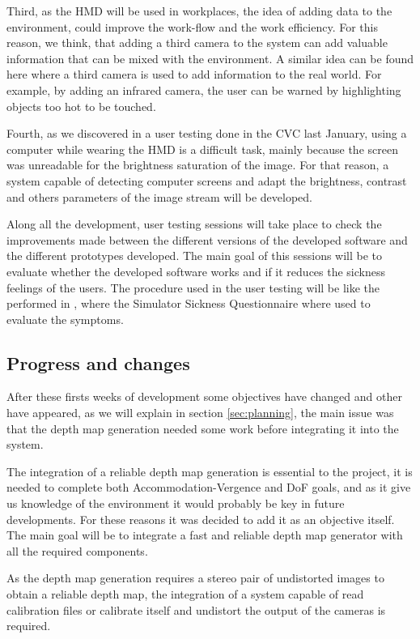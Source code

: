 \documentclass[10pt,a4paper,twocolumn,twoside]{article}
\begin{document}
	Third, as the HMD will be used in workplaces, the idea of adding data to the environment, could improve the work-flow and the work efficiency. For this reason, we think, that adding a third camera to the system can add valuable information that can be mixed with the environment. A similar idea can be found here \cite{vismerge} where a third camera is used to add information to the real world. For example, by adding an infrared camera, the user can be warned by highlighting objects too hot to be touched.
	
	Fourth, as we discovered in a user testing done in the CVC \cite{unpublishCVC} last January, using a computer while wearing the HMD is a difficult task, mainly because the screen was unreadable for the brightness saturation of the image. For that reason, a system capable of detecting computer screens and adapt the brightness, contrast and others parameters of the image stream will be developed.
	
	Along all the development, user testing sessions will take place to check the improvements made between the different versions of the developed software and the different prototypes developed. The main goal of this sessions will be to evaluate whether the developed software works and if it reduces the sickness feelings of the users. The procedure used in the user testing will be like the performed in \cite{ifftConfortDoF}, where the Simulator Sickness Questionnaire \cite{ssqQuestion} where used to evaluate the symptoms. 
	
	\subsection{Progress and changes}
	
	After these firsts weeks of development some objectives have changed and other have appeared, as we will explain in section \ref{sec:planning}, the main issue was that the depth map generation needed some work before integrating it into the system.
	
	The integration of a reliable depth map generation is essential to the project, it is needed to complete both Accommodation-Vergence and DoF goals, and as it give us knowledge of the environment it would probably be key in future developments. For these reasons it was decided to add it as an objective itself. The main goal will be to integrate a fast and reliable depth map generator with all the required components.
	
	As the depth map generation requires a stereo pair of undistorted images to obtain a reliable depth map, the integration of a system capable of read calibration files or calibrate itself and undistort the output of the cameras is required.  
\end{document}
